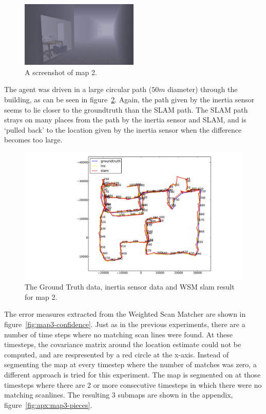 \begin{figure}[ht]
\centering
  \includegraphics[width=0.5\textwidth]{images/experiment/map3/map3.png}
  \caption{A screenshot of map 2.}
  \label{fig:map3-screenshot}
\end{figure}

The agent was driven in a large circular path ($50m$ diameter) through the building, as can be seen in figure~\ref{fig:map3-trace}. Again, the path given by the inertia sensor seems to lie closer to the groundtruth than the SLAM path. The SLAM path strays on many places from the path by the inertia sensor and SLAM, and is `pulled back' to the location given by the inertia sensor when the difference becomes too large.

\begin{figure}[ht]
\centering
  \includegraphics[width=\textwidth]{images/experiment/map3/trace2.pdf}
  \caption{The Ground Truth data, inertia sensor data and WSM slam result for map 2.}
  \label{fig:map3-trace}
\end{figure}

The error measures extracted from the Weighted Scan Matcher are shown in figure~\ref{fig:map3-confidence}. Just as in the previous experiments, there are a number of time steps where no matching scan lines were found. At these timesteps, the covariance matrix around the location estimate could not be computed, and are respresented by a red circle at the x-axis. Instead of segmenting the map at every timestep where the number of matches was zero, a different approach is tried for this experiment. The map is segmented on at those timesteps where there are 2 or more consecutive timesteps in which there were no matching scanlines. The resulting 3 submaps are shown in the appendix, figure~\ref{fig:apx:map3-pieces}.

